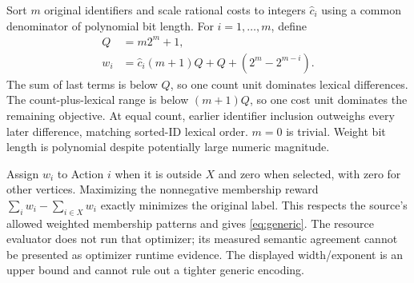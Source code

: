 Sort $m$ original identifiers and scale rational costs to integers $\widehat c_i$ using a common denominator of polynomial bit length. For $i=1,\ldots,m$, define
\begin{align}
Q&=m2^m+1,\\
w_i&=\widehat c_i(m+1)Q+Q+(2^m-2^{m-i}).
\end{align}
The sum of last terms is below $Q$, so one count unit dominates lexical differences. The count-plus-lexical range is below $(m+1)Q$, so one cost unit dominates the remaining objective. At equal count, earlier identifier inclusion outweighs every later difference, matching sorted-ID lexical order. $m=0$ is trivial. Weight bit length is polynomial despite potentially large numeric magnitude.

Assign $w_i$ to Action $i$ when it is outside $X$ and zero when selected, with zero for other vertices. Maximizing the nonnegative membership reward $\sum_iw_i-\sum_{i\in X}w_i$ exactly minimizes the original label. This respects the source's allowed weighted membership patterns and gives \eqref{eq:generic}. The resource evaluator does not run that optimizer; its measured semantic agreement cannot be presented as optimizer runtime evidence. The displayed width/exponent is an upper bound and cannot rule out a tighter generic encoding.
